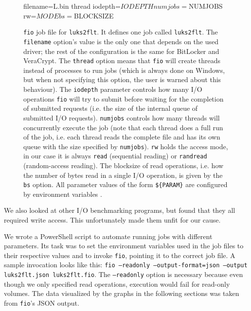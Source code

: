 \begin{figure}[htb!]
	\begin{inicode}
filename=L\:\random.bin
thread
iodepth=${IODEPTH}
numjobs=${NUMJOBS}
rw=${MODE}
bs=${BLOCKSIZE}
	\end{inicode}
	\caption[
		\texttt{fio} job file for \texttt{luks2flt}
	]{
		\texttt{fio} job file for \texttt{luks2flt}. It defines one job called \texttt{luks2flt}. The \texttt{filename} option's value is the only one that depends on the used driver; the rest of the configuration is the same for BitLocker and VeraCrypt. The \texttt{thread} option means that \texttt{fio} will create threads instead of processes to run jobs (which is always done on Windows, but when not specifying this option, the user is warned about this behaviour). The \texttt{iodepth} parameter controls how many I/O operations \texttt{fio} will try to submit before waiting for the completion of submitted requests (i.e. the size of the internal queue of submitted I/O requests). \texttt{numjobs} controls how many threads will concurrently execute the job (note that each thread does a full run of the job, i.e. each thread reads the complete file and has its own queue with the size specified by \texttt{numjobs}). \texttt{rw} holds the access mode, in our case it is always \texttt{read} (sequential reading) or \texttt{randread} (random-access reading). The blocksize of read operations, i.e. how the number of bytes read in a single I/O operation, is given by the \texttt{bs} option. All parameter values of the form \texttt{\$\{PARAM\}} are configured by environment variables \cite{Fio}.
	}
	\label{fig:performance.setup.fiojobfile}
\end{figure}

We also looked at other I/O benchmarking programs, but found that they all required write access. This unfortunately made them unfit for our cause.

We wrote a PowerShell script to automate running jobs with different parameters. Its task was to set the environment variables used in the job files to their respective values and to invoke \texttt{fio}, pointing it to the correct job file. A sample invocation looks like this: \texttt{fio ---readonly ---output-format=json ---output luks2flt.json luks2flt.fio}. The \texttt{---readonly} option is necessary because even though we only specified read operations, execution would fail for read-only volumes. The data visualized by the graphs in the following sections was taken from \texttt{fio}'s JSON output.

